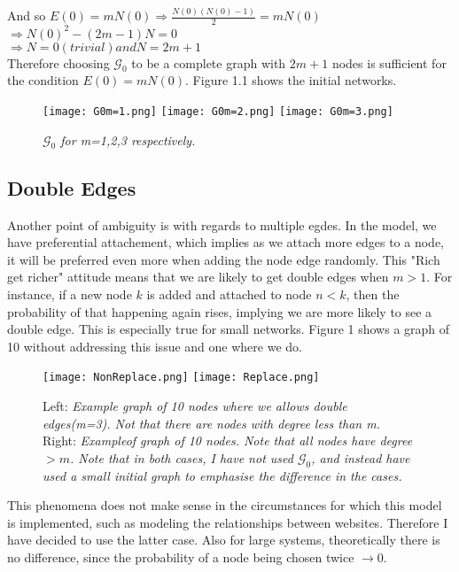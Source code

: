 \documentclass[]{article}
\begin{document}
\vspace{0.2cm}
And so $E(0)=mN(0) \Rightarrow \frac{N(0)(N(0)-1)}{2}=mN(0)$\\
\vspace{0.2cm}
$\Rightarrow N(0)^2 - (2m -1)N = 0$\\
\vspace{0.2cm}
$\Rightarrow N=0 (trivial) and N=2m+1$\\
\vspace{0.2cm}
Therefore choosing $\mathcal{G}_0$ to be a complete graph with $2m+1$ nodes is sufficient for the condition $E(0)=mN(0)$. Figure 1.1 shows the initial networks. 
\begin{figure}[htp]
	\centering
	
	\texttt{[image: G0m=1.png]}\hfill
	\texttt{[image: G0m=2.png]}\hfill
	\texttt{[image: G0m=3.png]}
	\caption{\textit{$\mathcal{G}_0$ for m=1,2,3 respectively.}}
\end{figure}
\subsection{Double Edges}
Another point of ambiguity is with regards to multiple egdes. In  the model, we have preferential attachement, which implies as we attach more edges to a node, it will be preferred even more when adding the node edge randomly. This "Rich get richer" attitude means that we are likely to get double edges when $m>1$. For instance, if a new node $k$ is added and attached to node $n<k$, then the probability of that happening again rises, implying we are more likely to see a double edge. This is especially true for small networks. Figure 1 shows a graph of 10 without addressing this issue and one where we do.
\begin{figure}[htp]
	\centering
	
	\texttt{[image: NonReplace.png]}
	\texttt{[image: Replace.png]}
	\caption{Left: \textit{Example graph of 10 nodes where we allows double edges(m=3). Not that there are nodes with degree less than m.}
		\\Right: \textit{Exampleof graph of 10 nodes. Note that all nodes have degree $>m$. Note that in both cases, I have not used $\mathcal{G}_0$, and instead have used a small initial graph to emphasise the difference in the cases.}}
\end{figure} 
This phenomena does not make sense in the circumstances for which this model is implemented, such as modeling the relationships between websites. Therefore I have decided to use the latter case. Also for large systems, theoretically there is no difference, since the probability of a node being chosen twice $\rightarrow 0$.
\end{document}
